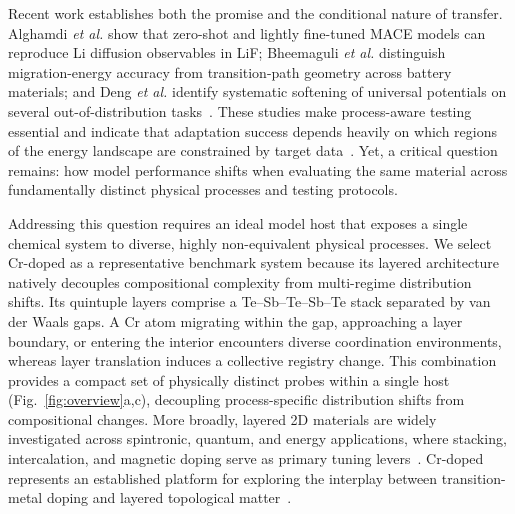 \documentclass[pdflatex,sn-mathphys-num]{sn-jnl}
\newif\ifreviewcopy
\newcommand{\rev}[2]{\ifreviewcopy{\color{revisionblue}#2\textsuperscript{\scriptsize[R1-#1]}}\else#2\fi}
\begin{document}
Recent work establishes both the promise and the conditional nature of transfer. \rev{A7}{Alghamdi \textit{et al.} show that zero-shot and lightly fine-tuned MACE models can reproduce Li diffusion observables in LiF; Bheemaguli \textit{et al.} distinguish migration-energy accuracy from transition-path geometry across battery materials; and Deng \textit{et al.} identify systematic softening of universal potentials on several out-of-distribution tasks~\citep{alghamdi2025maceLiF,bheemaguli2026mlipBarriers,deng2025softening}.} 
These studies make process-aware testing essential and indicate that adaptation success depends heavily on which regions of the energy landscape are constrained by target data~\citep{radova2025frozen_transfer,janet_designing_2019,lookman_active_2019,zuo_performance_2020,jinnouchi_phase_2020,zeni_data_2021,vandermause_on--fly_2020}. Yet, a critical question remains: how model performance shifts when evaluating the same material across fundamentally distinct physical processes and testing protocols.

Addressing this question requires an ideal model host that exposes a single chemical system to diverse, highly non-equivalent physical processes. We select Cr-doped  as a representative benchmark system because its layered architecture natively decouples compositional complexity from multi-regime distribution shifts. Its quintuple layers comprise a Te--Sb--Te--Sb--Te stack separated by van der Waals gaps. A Cr atom migrating within the gap, approaching a layer boundary, or entering the interior encounters diverse coordination environments, whereas layer translation induces a collective registry change. This combination provides a compact set of physically distinct probes within a single host (Fig.~\ref{fig:overview}a,c), decoupling process-specific distribution shifts from compositional changes. More broadly, layered 2D materials are widely investigated across spintronic, quantum, and energy applications, where stacking, intercalation, and magnetic doping serve as primary tuning levers~\citep{novoselov_2d_2016,manzeli_2d_2017,akinwande2017review,guo_stacking_2021,liu_roadmap_2024,he_topological_2022,qian_van_2024,song_electron_2018,nayak_microsoft_2025,jin_flexible_2019,gautam_creation_2024,whittingham_lithium_2004,winter_insertion_1998,hu_lithium_2024,gibertini_magnetic_2019,tokura_magnetic_2019}. Cr-doped  represents an established platform for exploring the interplay between transition-metal doping and layered topological matter~\citep{zhang_topological_2009,guo_roadmap_2015,cortie_creating_2020,han_effect_2013,de_a_deus_magnetic_2021,checkelsky_trajectory_2014,haazen_ferromagnetism_2012,klimovskikh_tunable_2020,fu_electronic_2021,sun_sb2te3_2023,zhang_quantum_2021,Zhang2023TuningStudy}.
\end{document}
